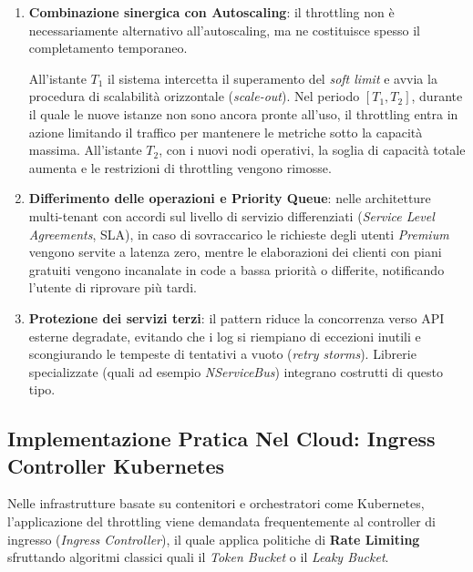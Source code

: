 \documentclass[11pt, a4paper]{article}
\begin{document}
\begin{enumerate}
    \item \textbf{Combinazione sinergica con Autoscaling}: il throttling non è necessariamente alternativo all'autoscaling, ma ne costituisce spesso il completamento temporaneo.


    All'istante $T_1$ il sistema intercetta il superamento del \emph{soft limit} e avvia la procedura di scalabilità orizzontale (\emph{scale-out}). Nel periodo $[T_1, T_2]$, durante il quale le nuove istanze non sono ancora pronte all'uso, il throttling entra in azione limitando il traffico per mantenere le metriche sotto la capacità massima. All'istante $T_2$, con i nuovi nodi operativi, la soglia di capacità totale aumenta e le restrizioni di throttling vengono rimosse.

    \item \textbf{Differimento delle operazioni e Priority Queue}: nelle architetture multi-tenant con accordi sul livello di servizio differenziati (\emph{Service Level Agreements}, SLA), in caso di sovraccarico le richieste degli utenti \emph{Premium} vengono servite a latenza zero, mentre le elaborazioni dei clienti con piani gratuiti vengono incanalate in code a bassa priorità o differite, notificando l'utente di riprovare più tardi.

    \item \textbf{Protezione dei servizi terzi}: il pattern riduce la concorrenza verso API esterne degradate, evitando che i log si riempiano di eccezioni inutili e scongiurando le tempeste di tentativi a vuoto (\emph{retry storms}). Librerie specializzate (quali ad esempio \emph{NServiceBus}) integrano costrutti di questo tipo.
\end{enumerate}

\subsection{Implementazione Pratica Nel Cloud: Ingress Controller Kubernetes}

Nelle infrastrutture basate su contenitori e orchestratori come Kubernetes, l'applicazione del throttling viene demandata frequentemente al controller di ingresso (\emph{Ingress Controller}), il quale applica politiche di \textbf{Rate Limiting} sfruttando algoritmi classici quali il \emph{Token Bucket} o il \emph{Leaky Bucket}.
\end{document}

